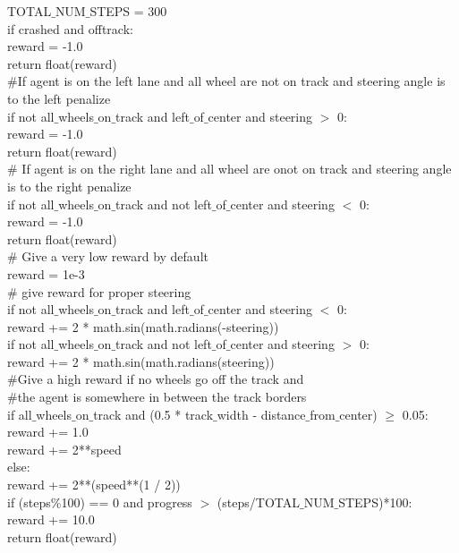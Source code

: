 \documentclass[journal]{IEEEtran}
\begin{document}
  TOTAL$\_$NUM$\_$STEPS = 300\\
    if crashed and offtrack:\\
        reward = -1.0\\
        return float(reward)\\

\#If agent is on the left lane and all wheel are not on track and steering angle is to the left penalize\\
    if not all$\_$wheels$\_$on$\_$track and left$\_$of$\_$center and steering $>$ 0:\\
        reward = -1.0\\
        return float(reward)\\
    \# If agent is on the right lane and all wheel are onot on track and steering angle is to the right penalize\\
    if not all$\_$wheels$\_$on$\_$track and not left$\_$of$\_$center and steering $<$ 0:\\
        reward = -1.0\\
        return float(reward)\\
    		\# Give a very low reward by default\\
    		reward = 1e-3\\
    		
\# give reward for proper steering\\
    if not all$\_$wheels$\_$on$\_$track and left$\_$of$\_$center and steering $<$ 0:\\
        reward += 2 * math.sin(math.radians(-steering))\\

    if not all$\_$wheels$\_$on$\_$track and not left$\_$of$\_$center and steering $>$ 0:\\
        reward += 2 * math.sin(math.radians(steering))\\
\#Give a high reward if no wheels go off the track and\\
\#the agent is somewhere in between the track borders\\
    if all$\_$wheels$\_$on$\_$track and (0.5 * track$\_$width - distance$\_$from$\_$center) $\geq$ 0.05:\\
        reward += 1.0\\
        reward += 2**speed\\
    else:\\
        reward += 2**(speed**(1 / 2))\\

if (steps\%100) == 0 and progress $>$ (steps/TOTAL$\_$NUM$\_$STEPS)*100:\\
        reward += 10.0\\
    return float(reward)\\
\end{document}
